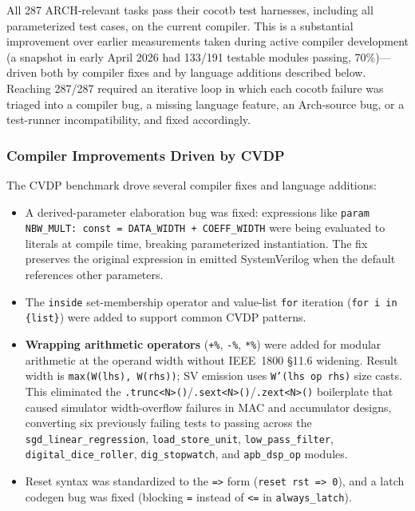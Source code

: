 \documentclass[11pt,twocolumn]{article}
\begin{document}
All 287 ARCH-relevant tasks pass their cocotb test harnesses, including all parameterized test cases, on the current compiler. This is a substantial improvement over earlier measurements taken during active compiler development (a snapshot in early April 2026 had 133/191 testable modules passing, 70\%)---driven both by compiler fixes and by language additions described below. Reaching 287/287 required an iterative loop in which each cocotb failure was triaged into a compiler bug, a missing language feature, an Arch-source bug, or a test-runner incompatibility, and fixed accordingly.

\subsubsection{Compiler Improvements Driven by CVDP}

The CVDP benchmark drove several compiler fixes and language additions:

\begin{itemize}
\item A derived-parameter elaboration bug was fixed: expressions like \texttt{param NBW\_MULT: const = DATA\_WIDTH + COEFF\_WIDTH} were being evaluated to literals at compile time, breaking parameterized instantiation. The fix preserves the original expression in emitted SystemVerilog when the default references other parameters.
\item The \texttt{inside} set-membership operator and value-list \texttt{for} iteration (\texttt{for i in \{list\}}) were added to support common CVDP patterns.
\item \textbf{Wrapping arithmetic operators} (\texttt{+\%}, \texttt{-\%}, \texttt{*\%}) were added for modular arithmetic at the operand width without IEEE~1800 §11.6 widening. Result width is \texttt{max(W(lhs), W(rhs))}; SV emission uses \texttt{W'(lhs op rhs)} size casts. This eliminated the \texttt{.trunc<N>()}/\texttt{.sext<N>()}/\texttt{.zext<N>()} boilerplate that caused simulator width-overflow failures in MAC and accumulator designs, converting six previously failing tests to passing across the \texttt{sgd\_linear\_regression}, \texttt{load\_store\_unit}, \texttt{low\_pass\_filter}, \texttt{digital\_dice\_roller}, \texttt{dig\_stopwatch}, and \texttt{apb\_dsp\_op} modules.
\item Reset syntax was standardized to the \texttt{=>} form (\texttt{reset rst => 0}), and a latch codegen bug was fixed (blocking \texttt{=} instead of \texttt{<=} in \texttt{always\_latch}).
\end{itemize}
\end{document}
